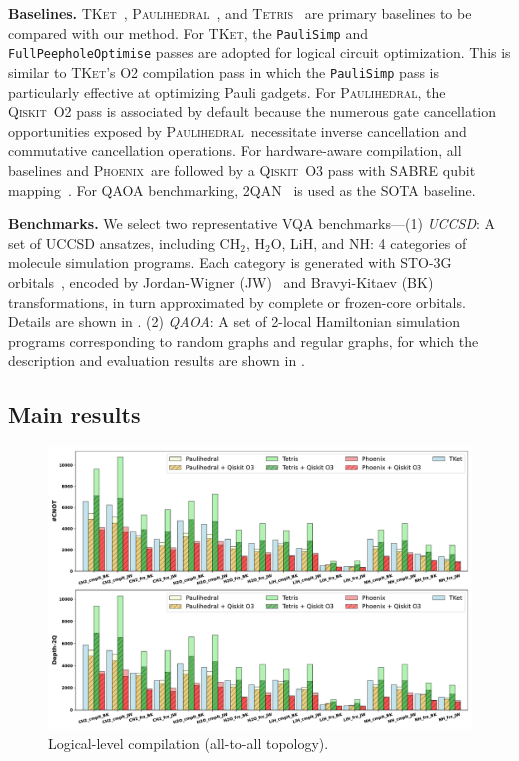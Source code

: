 \documentclass[conference,9pt]{IEEEtran}
\newcommand{\code}{\texttt}
\newcommand{\phoenix}{\textsc{Phoenix}}
\newcommand{\qiskit}{\textsc{Qiskit}}
\newcommand{\tket}{\textsc{TKet}}
\newcommand{\tetris}{\textsc{Tetris}}
\newcommand{\paulihedral}{\textsc{Paulihedral}}
\newcommand{\twoqan}{\textsc{2QAN}}
\newcommand{\CHtwo}{CH$_2$}
\newcommand{\HtwoO}{H$_2$O}
\newcommand{\LiH}{LiH}
\newcommand{\NH}{NH}
\begin{document}
    \textbf{Baselines.} \tket~\cite{sivarajah2020t}, \paulihedral~\cite{li2022paulihedral}, and \tetris~\cite{jin2024tetris} are primary baselines to be compared with our method. For \tket, the \code{PauliSimp} and \code{FullPeepholeOptimise} passes are adopted for logical circuit optimization. This is similar to \tket's O2 compilation pass in which the \code{PauliSimp} pass is particularly effective at optimizing Pauli gadgets. For \paulihedral, the \qiskit\ O2 pass is associated by default because the numerous gate cancellation opportunities exposed by \paulihedral\ necessitate inverse cancellation and commutative cancellation operations. For hardware-aware compilation, all baselines and \phoenix\ are followed by a \qiskit\ O3 pass with SABRE qubit mapping~\cite{li2019tackling}. For QAOA benchmarking, \twoqan~\cite{lao20222qan} is used as the SOTA baseline.

    \textbf{Benchmarks.} We select two representative VQA benchmarks---(1) \emph{UCCSD}: A set of UCCSD ansatzes, including \CHtwo, \HtwoO, \LiH, and \NH: 4 categories of molecule simulation programs. Each category is generated with STO-3G orbitals~\cite{hehre1969self}, encoded by Jordan-Wigner (JW)~\cite{jordan1928paulische} and Bravyi-Kitaev (BK)~\cite{bravyi2002fermionic} transformations, in turn approximated by complete or frozen-core orbitals. Details are shown in . (2) \emph{QAOA}: A set of 2-local Hamiltonian simulation programs corresponding to random graphs and regular graphs, for which the description and evaluation results are shown in .
    






\subsection{Main results}


    \begin{figure}[tbp]
        \centering
        \includegraphics[width=\columnwidth]{figures/all2all.pdf}
        \caption{Logical-level compilation (all-to-all topology).}
        \label{fig:all2all}
    \end{figure}
\end{document}
